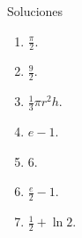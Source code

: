 \documentclass[main.tex]{subfiles}
\begin{document}
\begin{frame}{Soluciones}
\begin{enumerate}\item $\displaystyle\frac\pi2$.\item $\displaystyle\frac92$.\item $\displaystyle\frac13\pi r^2h$.\item $e-1$.\item $6$.\item $\displaystyle\frac e2-1$.\item $\displaystyle\frac12+\ln2$.\end{enumerate}
\end{frame}
\end{document}
